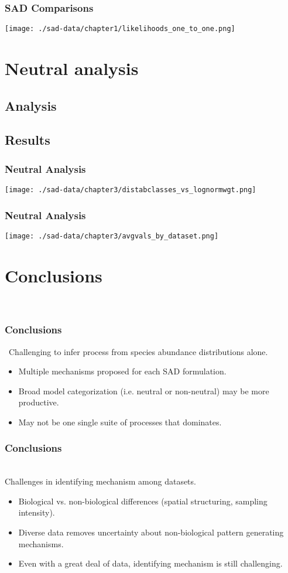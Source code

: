\documentclass[14pt]{beamer}
\begin{document}
\begin{frame}{}
\frametitle{SAD Comparisons}
\texttt{[image: ./sad-data/chapter1/likelihoods\_one\_to\_one.png]}
\end{frame}

\section{Neutral analysis}
\subsection{Analysis}
\subsection{Results}
\begin{frame}{}
\frametitle{Neutral Analysis}
\texttt{[image: ./sad-data/chapter3/distabclasses\_vs\_lognormwgt.png]}
\end{frame}

\begin{frame}{}
\frametitle{Neutral Analysis}
\texttt{[image: ./sad-data/chapter3/avgvals\_by\_dataset.png]}
\end{frame}

\section{Conclusions}
\begin{frame}{}
~\\ 
\frametitle{Conclusions}\
Challenging to infer process from species abundance distributions alone.
~\\ 
\begin{itemize}
\item Multiple mechanisms proposed for each SAD formulation.
\item Broad model categorization (i.e. neutral or non-neutral) may be more productive.
\item May not be one single suite of processes that dominates.
\end{itemize} 
\end{frame}

\begin{frame}[t]{}
\frametitle{Conclusions}\
~\\ 
Challenges in identifying mechanism among datasets.
~\\ 
\begin{itemize}
\item Biological vs. non-biological differences (spatial structuring, sampling intensity).
\item Diverse data removes uncertainty about non-biological pattern generating mechanisms.
\item Even with a great deal of data, identifying mechanism is still challenging.
\end{itemize} 
\end{frame}
\end{document}
